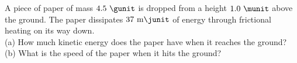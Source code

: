 A piece of paper of mass $4.5\ \gunit$ is dropped from a height $1.0\ \munit$
above the ground. The paper dissipates $37\ \text{m}\junit$
of energy through frictional heating on its way down.\\
%
(a) How much kinetic energy does the paper have when it reaches the
ground?\answercheck\hwendpart
%
(b) What is the speed of the paper when it hits the ground?\answercheck

